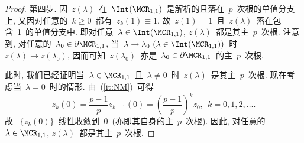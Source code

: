\begin{proof}


第四步.
因~$z(\lambda)$~在~$\Int(\MCR_{1,1})$~是解析的且落在~$p$~次根的单值分支上,
又因对任意的~$k\geq0$~都有~$z_k(1) \equiv 1$, 故~$z(1) =
1$~且~$z(\lambda)$~落在包含~1~的单值分支中. 即对任意~$\lambda \in
\Int(\MCR_{1,1})$, $z(\lambda)$~都是其主~$p$~次根. 注意到,
对任意的~$\lambda_0 \in
\partial\MCR_{1,1}$, 当~$\lambda
\to \lambda_0 \ (\lambda \in \Int(\MCR_{1,1}))$~时~$z(\lambda) \to
z(\lambda_0)$, 因而可知~$z(\lambda_0)$~亦是~$\lambda_0 \in
\partial\MCR_{1,1}$~的主~$p$~次根.



此时, 我们已经证明当~$\lambda \in \MCR_{1,1}$~且~$\lambda \neq
0$~时~$z(\lambda)$~是其主~$p$~次根. 现在考虑当~$\lambda =
0$~时的情形. 由~(\ref{it:NM})~可得
$$
z_k(0) = \frac{p-1}{p} z_{k-1}(0) = \left(\frac{p-1}{p}\right)^k
z_0, \ \ k = 0, 1, 2, \ldots.
$$
故 ~$\{z_k(0)\}$~线性收敛到~0~(亦即其自身的主~$p$~次根). 因此,
对任意的~$\lambda \in \MCR_{1,1}$, $z(\lambda)$~都是其主~$p$~次根.



\end{proof}
